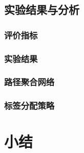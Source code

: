 \subsection{实验结果与分析}
\subsubsection{评价指标} 
\subsubsection{实验结果}
\subsubsection{路径聚合网络}
\subsubsection{标签分配策略}
\section{小结}


